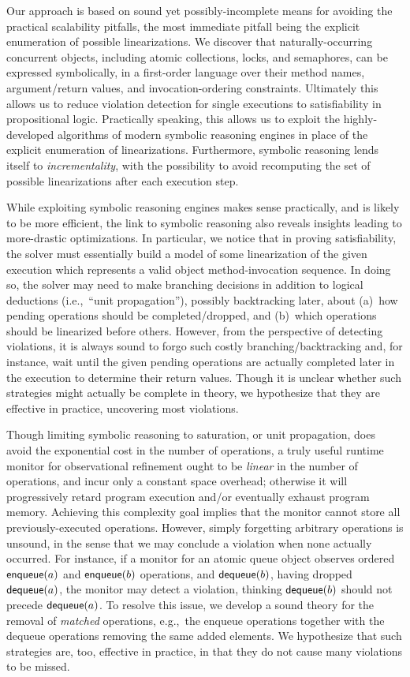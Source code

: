 Our approach is based on sound yet possibly-incomplete means for avoiding the
practical scalability pitfalls, the most immediate pitfall being the explicit
enumeration of possible linearizations. We discover that naturally-occurring
concurrent objects, including atomic collections, locks, and semaphores, can be
expressed symbolically, in a first-order language over their method names,
argument/return values, and invocation-ordering constraints. Ultimately this
allows us to reduce violation detection for single executions to satisfiability
in propositional logic. Practically speaking, this allows us to exploit the
highly-developed algorithms of modern symbolic reasoning engines in place of
the explicit enumeration of linearizations. Furthermore, symbolic reasoning
lends itself to \emph{incrementality}, with the possibility to avoid
recomputing the set of possible linearizations after each execution step.

While exploiting symbolic reasoning engines makes sense practically, and is
likely to be more efficient, the link to symbolic reasoning also reveals
insights leading to more-drastic optimizations. In particular, we notice that
in proving satisfiability, the solver must essentially build a model of some
linearization of the given execution which represents a valid object
method-invocation sequence. In doing so, the solver may need to make branching
decisions in addition to logical deductions (i.e.,~``unit propagation''),
possibly backtracking later, about (a)~how pending operations should be
completed/dropped, and (b)~which operations should be linearized before others.
However, from the perspective of detecting violations, it is always sound to
forgo such costly branching/backtracking and, for instance, wait until the
given pending operations are actually completed later in the execution to
determine their return values. Though it is unclear whether such strategies
might actually be complete in theory, we hypothesize that they are effective in
practice, uncovering most violations.

Though limiting symbolic reasoning to saturation, or unit propagation, does
avoid the exponential cost in the number of operations, a truly useful runtime
monitor for observational refinement ought to be \emph{linear} in the number of
operations, and incur only a constant space overhead; otherwise it will
progressively retard program execution and/or eventually exhaust program
memory. Achieving this complexity goal implies that the monitor cannot store
all previously-executed operations. However, simply forgetting arbitrary
operations is unsound, in the sense that we may conclude a violation when none
actually occurred. For instance, if a monitor for an atomic queue object
observes ordered ${\sf enqueue}(a)$ and ${\sf enqueue}(b)$ operations, and
${\sf dequeue}(b)$, having dropped ${\sf dequeue}(a)$, the monitor may detect a
violation, thinking ${\sf dequeue}(b)$ should not precede ${\sf dequeue}(a)$.
To resolve this issue, we develop a sound theory for the removal of
\emph{matched} operations, e.g.,~the {\sf enqueue} operations together with the
{\sf dequeue} operations removing the same added elements. We hypothesize that
such strategies are, too, effective in practice, in that they do not cause many
violations to be missed.

